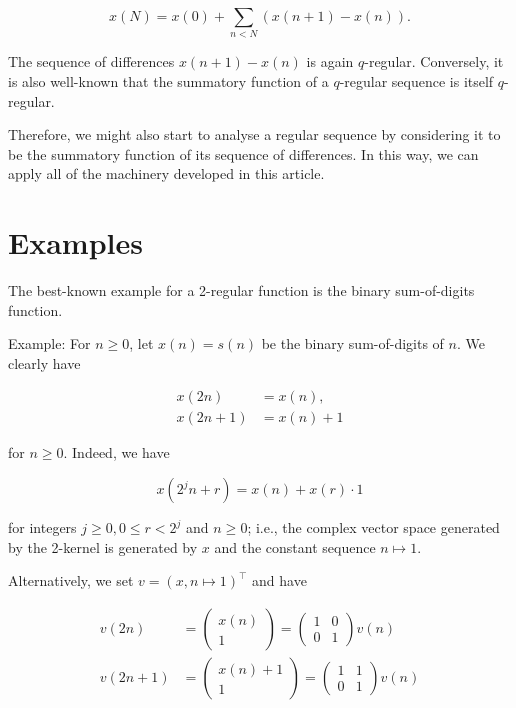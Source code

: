 \documentclass[10pt]{article}
\begin{document}
$$
x(N)=x(0)+\sum_{n<N}(x(n+1)-x(n)) .
$$

The sequence of differences $x(n+1)-x(n)$ is again $q$-regular. Conversely, it is also well-known that the summatory function of a $q$-regular sequence is itself $q$-regular.

Therefore, we might also start to analyse a regular sequence by considering it to be the summatory function of its sequence of differences. In this way, we can apply all of the machinery developed in this article.
 
 

\section{Examples}

The best-known example for a 2-regular function is the binary sum-of-digits function.

Example: For $n \geq 0$, let $x(n)=s(n)$ be the binary sum-of-digits of $n$. We clearly have

$$
\begin{aligned}
	x(2 n) & =x(n), \\
	x(2 n+1) & =x(n)+1
\end{aligned}
$$

for $n \geq 0$. Indeed, we have

$$
x\left(2^{j} n+r\right)=x(n)+x(r) \cdot 1
$$

for integers $j \geq 0,0 \leq r<2^{j}$ and $n \geq 0$; i.e., the complex vector space generated by the 2-kernel is generated by $x$ and the constant sequence $n \mapsto 1$.

Alternatively, we set $v=(x, n \mapsto 1)^{\top}$ and have

$$
\begin{aligned}
	v(2 n) & =\left(\begin{array}{c}
		x(n) \\
		1
	\end{array}\right)=\left(\begin{array}{ll}
		1 & 0 \\
		0 & 1
	\end{array}\right) v(n) \\
	v(2 n+1) & =\left(\begin{array}{c}
		x(n)+1 \\
		1
	\end{array}\right)=\left(\begin{array}{ll}
		1 & 1 \\
		0 & 1
	\end{array}\right) v(n)
\end{aligned}
$$
\end{document}
